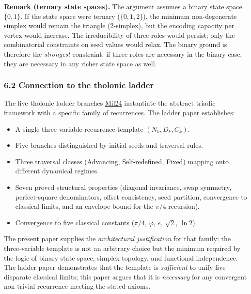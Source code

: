 \documentclass[
  11pt,
  letterpaper,
]{article}
\providecommand{\tightlist}{%
  \setlength{\itemsep}{0pt}\setlength{\parskip}{0pt}}
\begin{document}
\textbf{Remark (ternary state spaces).} The argument assumes a binary
state space \(\{0, 1\}\). If the state space were ternary
(\(\{0, 1, 2\}\)), the minimum non-degenerate simplex would remain the
triangle (2-simplex), but the encoding capacity per vertex would
increase. The irreducibility of three roles would persist; only the
combinatorial constraints on seed values would relax. The binary ground
is therefore the \emph{strongest} constraint: if three roles are
necessary in the binary case, they are necessary in any richer state
space as well.

\subsubsection{6.2 Connection to the tholonic
ladder}\label{connection-to-the-tholonic-ladder}

The five tholonic ladder branches
\href{https://tholonia.github.io/the-book/}{Mil24} instantiate the
abstract triadic framework with a specific family of recurrences. The
ladder paper establishes:

\begin{itemize}
\tightlist
\item
  A single three-variable recurrence template \((N_k, D_k, C_k)\).
\item
  Five branches distinguished by initial seeds and traversal rules.
\item
  Three traversal classes (Advancing, Self-redefined, Fixed) mapping
  onto different dynamical regimes.
\item
  Seven proved structural properties (diagonal invariance, swap
  symmetry, perfect-square denominators, offset consistency, seed
  partition, convergence to classical limits, and an envelope bound for
  the \(\pi/4\) recursion).
\item
  Convergence to five classical constants (\(\pi/4\), \(\varphi\),
  \(e\), \(\sqrt{2}\), \(\ln 2\)).
\end{itemize}

The present paper supplies the \emph{architectural justification} for
that family: the three-variable template is not an arbitrary choice but
the minimum required by the logic of binary state space, simplex
topology, and functional independence. The ladder paper demonstrates
that the template is \emph{sufficient} to unify five disparate classical
limits; this paper argues that it is \emph{necessary} for any convergent
non-trivial recurrence meeting the stated axioms.
\end{document}
